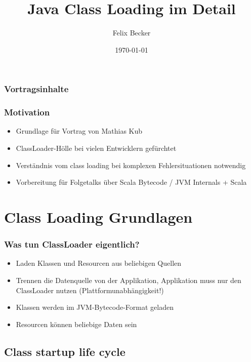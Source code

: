 \documentclass[aspectratio=169]{beamer}
\title{Java Class Loading im Detail}
\author{Felix Becker}
\date{\today}
\institute{Scala Usergroup Köln}
\begin{document}
\maketitle


\begin{frame}
	\frametitle{Vortragsinhalte}
	\tableofcontents
\end{frame}

\begin{frame}
	\frametitle{Motivation}
	\begin{itemize}
		\item{Grundlage für Vortrag von Mathias Kub}
		\item{ClassLoader-Hölle bei vielen Entwicklern gefürchtet}
		\item{Verständnis vom class loading bei komplexen Fehlersituationen notwendig}
		\item{Vorbereitung für Folgetalks über Scala Bytecode / JVM Internals + Scala}
	\end{itemize}
\end{frame}

\section{Class Loading Grundlagen}

\begin{frame}
	\frametitle{Was tun ClassLoader eigentlich?}
	\begin{itemize}
		\item{Laden Klassen und Resourcen aus beliebigen Quellen}
		\item{Trennen die Datenquelle von der Applikation, Applikation muss nur den ClassLoader nutzen (Plattformunabhängigkeit!)}
		\item{Klassen werden im JVM-Bytecode-Format geladen}
		\item{Resourcen können beliebige Daten sein}
	\end{itemize}
\end{frame}

\subsection{Class startup life cycle}
\end{document}
